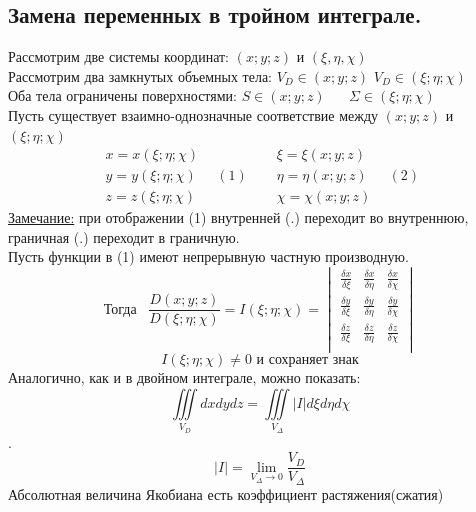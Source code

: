 \documentclass[12pt]{article}
\let\oldiiint\iiint
\let\oldlim\lim
\renewcommand{\iiint}{\oldiiint\limits}
\renewcommand{\lim}{\oldlim\limits}
\begin{document}
  \subsection{Замена переменных в тройном интеграле.}
  Рассмотрим две системы координат: $(x;y;z) \text{ и } (\xi,\eta,\chi)$\\
  Рассмотрим два замкнутых объемных тела: $V_D \in (x;y;z)$ \hspace{20pt} $V_D \in (\xi;\eta;\chi)$\\
  Оба тела ограничены поверхностями: $S \in (x;y;z) \hspace{20pt} \Sigma \in (\xi;\eta;\chi)$\\
  Пусть существует взаимно-однозначные соответствие между $(x;y;z)$ и $(\xi;\eta;\chi)$
  \[\begin{matrix}
    x=x(\xi;\eta;\chi)\\
    y=y(\xi;\eta;\chi)\\
    z=z(\xi;\eta;\chi)
  \end{matrix}\hspace{10pt}(1) \hspace{20pt}
  \begin{matrix}
    \xi=\xi(x;y;z)\\
    \eta=\eta(x;y;z)\\
    \chi=\chi(x;y;z)
  \end{matrix}\hspace{10pt}(2)\]
  \underline{Замечание:} при отображении (1) внутренней (.) переходит во внутреннюю, граничная (.) переходит в граничную.\\
  Пусть функции в (1)  имеют непрерывную частную производную.
  \[\text{Тогда} \hspace{10pt} \frac{D(x;y;z)}{D(\xi;\eta;\chi)} = I(\xi;\eta;\chi)=\begin{vmatrix}
    \frac{\delta x}{\delta \xi} & \frac{\delta x}{\delta \eta} & \frac{\delta x}{\delta \chi}\\
    \frac{\delta y}{\delta \xi} & \frac{\delta y}{\delta \eta} & \frac{\delta y}{\delta \chi}\\
    \frac{\delta z}{\delta \xi} & \frac{\delta z}{\delta \eta} & \frac{\delta z}{\delta \chi}\\
  \end{vmatrix}\]
  \[I(\xi;\eta;\chi)\not = 0 \text{ и сохраняет знак}\]
  Аналогично, как и в двойном интеграле, можно показать:
  \[\iiint_{V_D}dxdydz=\iiint_{V_\Delta}|I|d\xi d\eta d\chi\].
  \[|I|=\lim_{V_\Delta \to 0}\frac{V_D}{V_\Delta}\] Абсолютная величина Якобиана есть коэффициент растяжения(сжатия)
\end{document}
